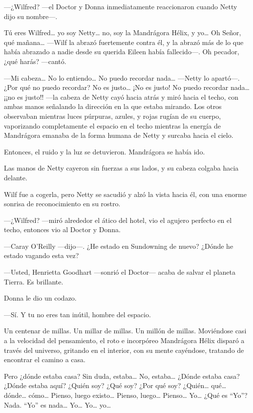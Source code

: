 ---¿Wilfred? ---el Doctor y Donna inmediatamente reaccionaron cuando
Netty dijo su nombre---.

Tú eres Wilfred\ldots{} yo soy Netty\ldots{} no, soy la Mandrágora
Hélix, y yo\ldots{} Oh Señor, qué mañana\ldots{} ---Wilf la abrazó
fuertemente contra él, y la abrazó más de lo que había abrazado a nadie
desde su querida Eileen había fallecido---. Oh pecador, ¿qué harás?
---cantó.

---Mi cabeza\ldots{} No lo entiendo\ldots{} No puedo recordar
nada\ldots{} ---Netty lo apartó---. ¿Por qué no puedo recordar? No es
justo\ldots{} ¡No es justo! No puedo recordar nada\ldots{} ¡¡no es
justo!! ---la cabeza de Netty cayó hacia atrás y miró hacia el techo,
con ambas manos señalando la dirección en la que estaba mirando. Los
otros observaban mientras luces púrpuras, azules, y rojas rugían de su
cuerpo, vaporizando completamente el espacio en el techo mientras la
energía de Mandrágora emanaba de la forma humana de Netty y surcaba
hacia el cielo.

Entonces, el ruido y la luz se detuvieron. Mandrágora se había ido.

Las manos de Netty cayeron sin fuerzas a sus lados, y su cabeza colgaba
hacia delante.

Wilf fue a cogerla, pero Netty se sacudió y alzó la vista hacia él, con
una enorme sonrisa de reconocimiento en su rostro.

---¿Wilfred? ---miró alrededor el ático del hotel, vio el agujero
perfecto en el techo, entonces vio al Doctor y Donna.

---Caray O'Reilly ---dijo---. ¿He estado en Sundowning de nuevo? ¿Dónde
he estado vagando esta vez?

---Usted, Henrietta Goodhart ---sonrió el Doctor--- acaba de salvar el
planeta Tierra. Es brillante.

Donna le dio un codazo.

---Sí. Y tu no eres tan inútil, hombre del espacio.

Un centenar de millas. Un millar de millas. Un millón de millas.
Moviéndose casi a la velocidad del pensamiento, el roto e incorpóreo
Mandrágora Hélix disparó a través del universo, gritando en el interior,
con su mente cayéndose, tratando de encontrar el camino a casa.

Pero ¿dónde estaba casa? Sin duda, estaba\ldots{} No, estaba\ldots{}
¿Dónde estaba casa? ¿Dónde estaba aquí? ¿Quién soy? ¿Qué soy? ¿Por
qué soy? ¿Quién\ldots{} qué\ldots{} dónde\ldots{} cómo\ldots{} Pienso,
luego existo\ldots{} Pienso, luego\ldots{} Pienso\ldots{} Yo\ldots{}
¿Qué es ``Yo''? Nada. ``Yo'' es nada\ldots{} Yo\ldots{} Yo\ldots{}
yo\ldots{}


